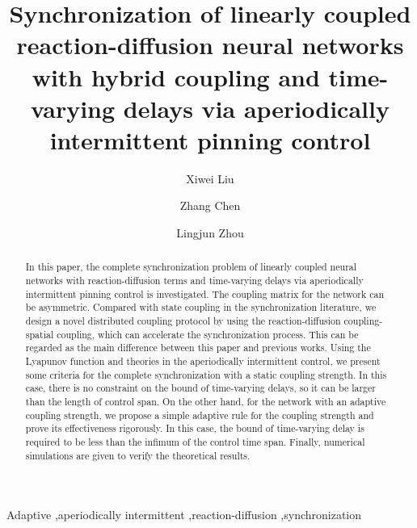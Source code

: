 \documentclass[review]{elsarticle}
\begin{document}
\begin{frontmatter}

\title{Synchronization of linearly coupled reaction-diffusion neural networks with hybrid coupling and time-varying delays via aperiodically intermittent pinning control}

\author[tongji,tjcs]{Xiwei Liu}
\author[sd]{Zhang Chen}
\author[tjmath]{Lingjun Zhou}

\address[tongji]{Department of Computer Science and
Technology, Tongji University, Shanghai 201804, China}
\address[tjcs]{The Key Laboratory of Embedded System and Service Computing,
Ministry of Education, Shanghai 201804, China}
\address[sd]{School of Mathematics, Shandong University, Jinan 250100, China}
\address[tjmath]{Department of Mathematics, Tongji University, Shanghai 200092, China}

\begin{abstract}
In this paper, the complete synchronization problem of linearly coupled neural networks with reaction-diffusion terms and time-varying delays via aperiodically intermittent pinning control is investigated. The coupling matrix for the network can be asymmetric. Compared with state coupling in the synchronization literature, we design a novel distributed coupling protocol by using the reaction-diffusion coupling-spatial coupling, which can accelerate the synchronization process. This can be regarded as the main difference between this paper and previous works. Using the Lyapunov function and theories in the aperiodically intermittent control, we present some criteria for the complete synchronization with a static coupling strength. In this case, there is no constraint on the bound of time-varying delays, so it can be larger than the length of control span. On the other hand, for the network with an adaptive coupling strength, we propose a simple adaptive rule for the coupling strength and prove its effectiveness rigorously. In this case, the bound of time-varying delay is required to be less than the infimum of the control time span. Finally, numerical simulations are given to verify the theoretical results.
\end{abstract}

\begin{keyword}
Adaptive \sep aperiodically intermittent \sep reaction-diffusion \sep synchronization
\end{keyword}

\end{frontmatter}
\end{document}
